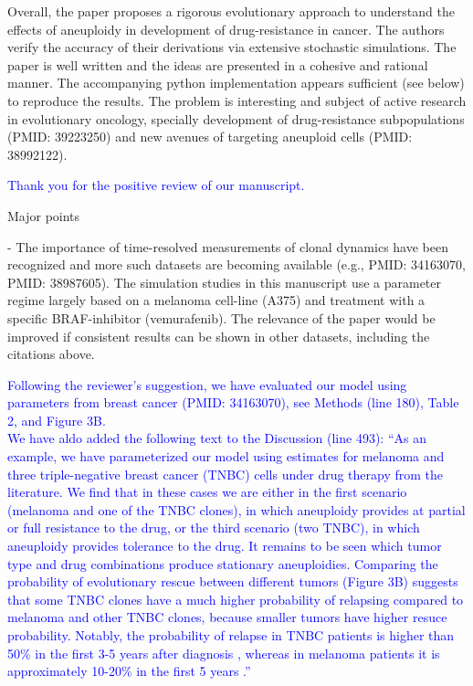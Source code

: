 \documentclass[12pt]{extarticle}
\begin{document}

Overall, the paper proposes a rigorous evolutionary approach to understand the effects of aneuploidy in development of drug-resistance in cancer. The authors verify the accuracy of their derivations via extensive stochastic simulations. The paper is well written and the ideas are presented in a cohesive and rational manner. The accompanying python implementation appears sufficient (see below) to reproduce the results. The problem is interesting and subject of active research in evolutionary oncology, specially development of drug-resistance subpopulations (PMID: 39223250) and new avenues of targeting aneuploid cells (PMID: 38992122).

\textcolor{blue}{Thank you for the positive review of our manuscript.}

Major points

- The importance of time-resolved measurements of clonal dynamics have been recognized and more such datasets are becoming available (e.g., PMID: 34163070, PMID: 38987605). The simulation studies in this manuscript use a parameter regime largely based on a melanoma cell-line (A375) and treatment with a specific BRAF-inhibitor (vemurafenib). The relevance of the paper would be improved if consistent results can be shown in other datasets, including the citations above.

\textcolor{blue}{Following the reviewer's suggestion, we have evaluated our model using parameters from breast cancer (PMID: 34163070), see Methods (line 180), Table 2, and Figure 3B.\\
We have aldo added the following text to the Discussion (line 493): ``As an example, we have parameterized our model using estimates for melanoma and three triple-negative breast cancer (TNBC) cells under drug therapy from the literature. 
We find that in these cases we are either in the first scenario (melanoma and one of the TNBC clones), in which aneuploidy provides at partial or full resistance to the drug, or the third scenario (two TNBC), in which aneuploidy provides tolerance to the drug. 
It remains to be seen which tumor type and drug combinations produce stationary aneuploidies. %
Comparing the probability of evolutionary rescue between different tumors (Figure 3B) suggests that some TNBC clones have a much higher probability of relapsing compared to melanoma and other TNBC clones, because smaller tumors have higher resuce probability. Notably, the probability of relapse in TNBC patients is higher than 50\% in the first 3-5 years after diagnosis \citep{taushanova2023synchronous}, whereas in melanoma patients it is approximately 10-20\% in the first 5 years \citep{wan2022prediction,von_schuckmann2019risk}.'' %
}%
\end{document}
